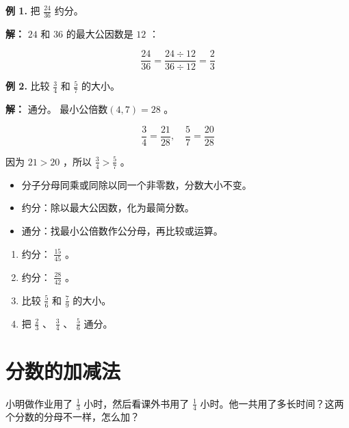 \begin{workedexamples}


\textbf{例 1.} 把 $\frac{24}{36}$ 约分。

\textbf{解：} $24$ 和 $36$ 的最大公因数是 $12$ ：

\[
\frac{24}{36} = \frac{24 \div 12}{36 \div 12} = \frac{2}{3}
\]


\textbf{例 2.} 比较 $\frac{3}{4}$ 和 $\frac{5}{7}$ 的大小。

\textbf{解：} 通分。 $\text{最小公倍数}(4, 7) = 28$ 。

\[
\frac{3}{4} = \frac{21}{28}, \quad \frac{5}{7} = \frac{20}{28}
\]


因为 $21 > 20$ ，所以 $\frac{3}{4} > \frac{5}{7}$ 。

\end{workedexamples}

\begin{keytakeaway}


\begin{itemize}
  \item 分子分母同乘或同除以同一个非零数，分数大小不变。
  \item 约分：除以最大公因数，化为最简分数。
  \item 通分：找最小公倍数作公分母，再比较或运算。
\end{itemize}


\end{keytakeaway}

\begin{practice}


\begin{enumerate}
  \item 约分： $\frac{15}{45}$ 。
  \item 约分： $\frac{28}{42}$ 。
  \item 比较 $\frac{5}{6}$ 和 $\frac{7}{9}$ 的大小。
  \item 把 $\frac{2}{3}$ 、 $\frac{3}{4}$ 、 $\frac{5}{6}$ 通分。
\end{enumerate}


\end{practice}

\section*{分数的加减法}


\begin{explore}


小明做作业用了 $\frac{1}{3}$ 小时，然后看课外书用了 $\frac{1}{4}$ 小时。他一共用了多长时间？这两个分数的分母不一样，怎么加？

\end{explore}


